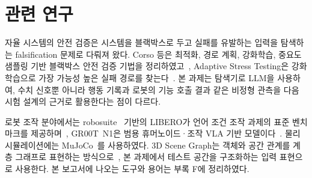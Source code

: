 \section{관련 연구}
자율 시스템의 안전 검증은 시스템을 블랙박스로 두고 실패를 유발하는 입력을 탐색하는
falsification 문제로 다뤄져 왔다. Corso 등은 최적화, 경로 계획, 강화학습, 중요도 샘플링 기반
블랙박스 안전 검증 기법을 정리하였고~\cite{corso}, Adaptive Stress Testing은 강화학습으로 가장 가능성
높은 실패 경로를 찾는다~\cite{ast}. 본 과제는 탐색기로 LLM을 사용하여, 수치 신호뿐 아니라 행동 기록과
로봇의 기능 호출 결과 같은 비정형 관측을 다음 시험 설계의 근거로 활용한다는 점이 다르다.

로봇 조작 분야에서는 robosuite~\cite{robosuite} 기반의 LIBERO가 언어 조건 조작 과제의 표준 벤치마크를 제공하며~\cite{libero},
GR00T~N1은 범용 휴머노이드·조작 VLA 기반 모델이다~\cite{groot}. 물리 시뮬레이션에는
MuJoCo~\cite{mujoco}를 사용하였다. 3D Scene Graph는 객체와 공간 관계를 계층 그래프로 표현하는
방식으로~\cite{sg}, 본 과제에서 테스트 공간을 구조화하는 입력 표현으로 사용한다.
본 보고서에 나오는 도구와 용어는 부록 F에 정리하였다.
